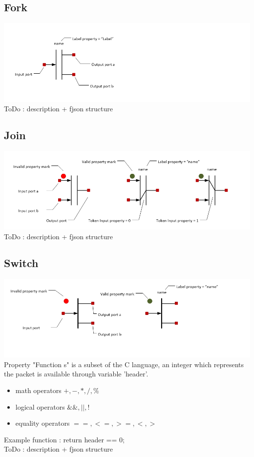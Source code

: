 \documentclass[a4paper,11pt,final]{article}
\begin{document}
\subsection{Fork}
\includegraphics[width=1.0\textwidth]{fork}
\\ToDo : description + fjson structure
\subsection{Join}
\includegraphics[width=1.0\textwidth]{join}
\\ToDo : description + fjson structure
\subsection{Switch}
\includegraphics[width=1.0\textwidth]{switch}
\\Property "Function s" is a subset of the C language, an integer which represents the packet is available through variable 'header'. 
\begin{itemize}
\item math operators $+,-,*,/,\%$
\item logical operators $\&\&,||,!$
\item equality operators $==,<=,>=,<,>$
\end{itemize} 
Example function : return header == 0;
\\ToDo : description + fjson structure  
\end{document}
